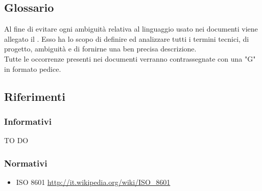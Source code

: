 	\subsection{Glossario}
Al fine di evitare ogni ambiguità relativa al linguaggio usato nei documenti viene allegato il \docNameVersionGlo.
Esso ha lo scopo di definire ed analizzare tutti i termini tecnici, di progetto, ambiguità e di fornirne una ben precisa descrizione.\\
Tutte le occorrenze presenti nei documenti verranno contrassegnate con una "G" in formato pedice.\\


	\subsection{Riferimenti}

		\subsubsection{Informativi}
TO DO
		\subsubsection{Normativi}
\begin{itemize}
\item ISO 8601 \url{http://it.wikipedia.org/wiki/ISO_8601}
\end{itemize}
